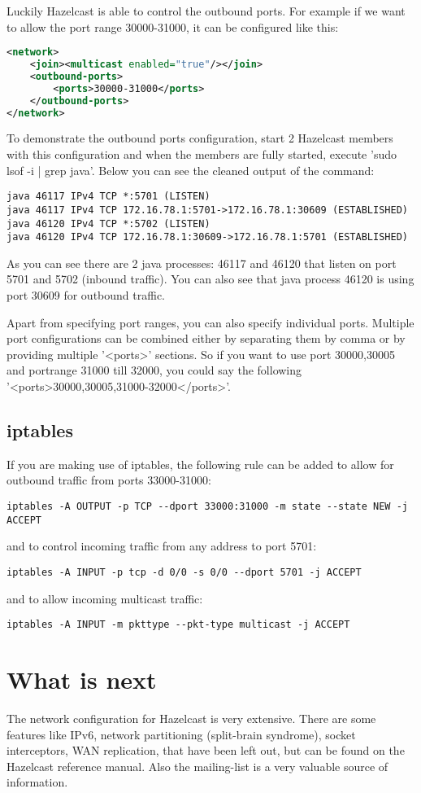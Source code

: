 Luckily Hazelcast is able to control the outbound ports. For example if we want to allow the port range 30000-31000, it can be configured like this:
\begin{lstlisting}[language=xml]
<network>
    <join><multicast enabled="true"/></join>
    <outbound-ports>
        <ports>30000-31000</ports>
    </outbound-ports>
</network>
\end{lstlisting}
To demonstrate the outbound ports configuration, start 2 Hazelcast members with this configuration and when the members are fully started, execute 'sudo lsof -i | grep java'. Below you can see the cleaned output of the command:
\begin{lstlisting}
java 46117 IPv4 TCP *:5701 (LISTEN)
java 46117 IPv4 TCP 172.16.78.1:5701->172.16.78.1:30609 (ESTABLISHED)
java 46120 IPv4 TCP *:5702 (LISTEN)
java 46120 IPv4 TCP 172.16.78.1:30609->172.16.78.1:5701 (ESTABLISHED)
\end{lstlisting}
As you can see there are 2 java processes: 46117 and 46120 that listen on port 5701 and 5702 (inbound traffic). You can also see that java process 46120 is using port 30609 for outbound traffic.

Apart from specifying port ranges, you can also specify individual ports. Multiple port configurations can be combined either by separating them by comma or by providing multiple '<ports>' sections. So if you want to use port 30000,30005 and portrange 31000 till 32000, you could say the following '<ports>30000,30005,31000-32000</ports>'. 

\subsection{iptables}
If you are making use of iptables, the following rule can be added to allow for outbound traffic from ports 33000-31000:
\begin{lstlisting}
iptables -A OUTPUT -p TCP --dport 33000:31000 -m state --state NEW -j ACCEPT
\end{lstlisting}
and to control incoming traffic from any address to port 5701:
\begin{lstlisting}
iptables -A INPUT -p tcp -d 0/0 -s 0/0 --dport 5701 -j ACCEPT
\end{lstlisting}
and to allow incoming multicast traffic:
\begin{lstlisting}
iptables -A INPUT -m pkttype --pkt-type multicast -j ACCEPT
\end{lstlisting}

\section{What is next}
The network configuration for Hazelcast is very extensive. There are some features like IPv6,  network partitioning (split-brain syndrome), socket interceptors, WAN replication, that have been left out, but can be found on the Hazelcast reference manual. Also the mailing-list is a very valuable source of information.

